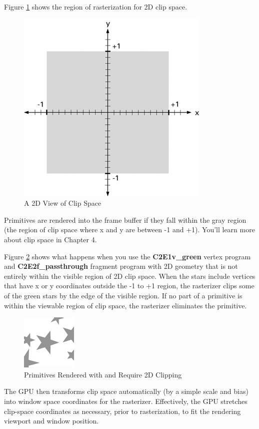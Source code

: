 \documentclass{book}
\begin{document}
Figure \ref{fig:2-6} shows the region of rasterization for 2D clip space.

\begin{figure}
    \centering
    \includegraphics[width=0.5\linewidth]{Images/fig2_6.jpg}
    \caption{A 2D View of Clip Space}
    \label{fig:2-6}
\end{figure}

Primitives are rendered into the frame buffer if they fall within the gray region (the region of clip space where x and y are between -1 and +1). You'll learn more about clip space in Chapter 4.

Figure \ref{fig:2-7} shows what happens when you use the \textbf{C2E1v\_green} vertex program and \textbf{C2E2f\_passthrough} fragment program with 2D geometry that is not entirely within the visible region of 2D clip space. When the stars include vertices that have x or y coordinates outside the -1 to +1 region, the rasterizer clips some of the green stars by the edge of the visible region. If no part of a primitive is within the viewable region of clip space, the rasterizer eliminates the primitive.

\begin{figure}
    \centering
    \includegraphics[width=0.25\linewidth]{Images/fig_0008.jpg}
    \caption{Primitives Rendered with and Require 2D Clipping}
    \label{fig:2-7}
\end{figure}

The GPU then transforms clip space automatically (by a simple scale and bias) into window space coordinates for the rasterizer. Effectively, the GPU stretches clip-space coordinates as necessary, prior to rasterization, to fit the rendering viewport and window position.
\end{document}
